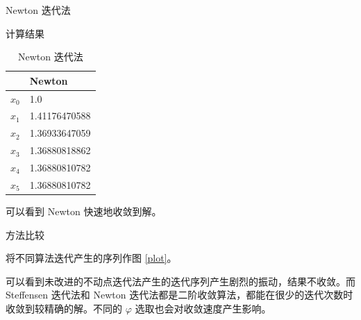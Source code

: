 \documentclass[a4paper]{article}
\begin{document}
\begin{multicols}{2}
\begin{section}{Newton 迭代法}
\begin{subsection}{计算结果}
		\begin{table}[H]
		\caption{Newton 迭代法}
		\centering
		\label{table_newton}
		\begin{tabular}{l|l}
		\hline
		      & Newton        \\ \hline
		$x_0$ & 1.0           \\
		$x_1$ & 1.41176470588 \\
		$x_2$ & 1.36933647059 \\
		$x_3$ & 1.36880818862 \\
		$x_4$ & 1.36880810782 \\
		$x_5$ & 1.36880810782
		\end{tabular}
		\end{table}
		
		可以看到 Newton 快速地收敛到解。
		
	\end{subsection}
	
\end{section}

\begin{section}{方法比较}

	将不同算法迭代产生的序列作图 \ref{plot}。
		
	可以看到未改进的不动点迭代法产生的迭代序列产生剧烈的振动，结果不收敛。而 Steffensen 迭代法和 Newton 迭代法都是二阶收敛算法，都能在很少的迭代次数时收敛到较精确的解。不同的 $\varphi$ 选取也会对收敛速度产生影响。
	

\end{section}
\end{multicols}
\end{document}
